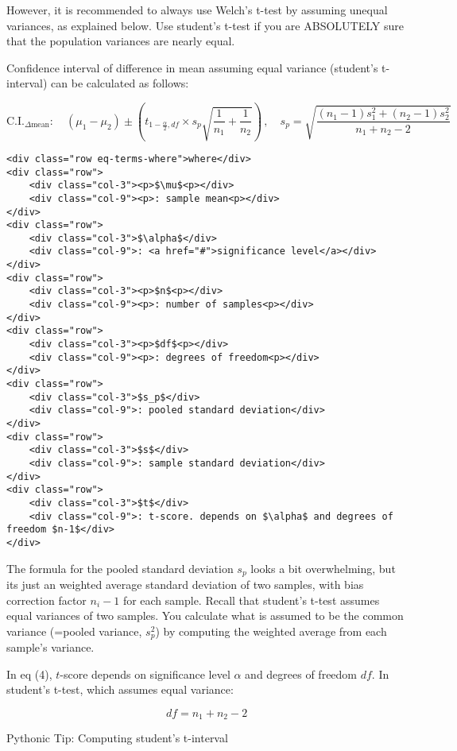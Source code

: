 \documentclass[11pt]{article}
\begin{document}
However, it is recommended to always use Welch's t-test by assuming
unequal variances, as explained below. Use student's t-test if you are
ABSOLUTELY sure that the population variances are nearly equal.

Confidence interval of difference in mean assuming equal variance
(student's t-interval) can be calculated as follows:

\hypertarget{eq-4}{}
\[ \text{C.I.}_{\Delta \text{mean}}: \quad (\mu_{1}- \mu_{2}) \pm (t_{1-\frac{\alpha}{2},df} \times s_p\sqrt{\frac{1}{n_1}+\frac{1}{n_2}})\,, \quad s_p = \sqrt{\frac{(n_1-1)s_{1}^2 + (n_2-1)s_{2}^2}{n_1+n_2-2}} \tag{4}\]

\begin{verbatim}
<div class="row eq-terms-where">where</div>
<div class="row">
    <div class="col-3"><p>$\mu$<p></div>
    <div class="col-9"><p>: sample mean<p></div>
</div>
<div class="row">
    <div class="col-3">$\alpha$</div>
    <div class="col-9">: <a href="#">significance level</a></div>
</div>    
<div class="row">
    <div class="col-3"><p>$n$<p></div>
    <div class="col-9"><p>: number of samples<p></div>
</div>
<div class="row">
    <div class="col-3"><p>$df$<p></div>
    <div class="col-9"><p>: degrees of freedom<p></div>
</div>    
<div class="row">
    <div class="col-3">$s_p$</div>
    <div class="col-9">: pooled standard deviation</div>
</div>  
<div class="row">
    <div class="col-3">$s$</div>
    <div class="col-9">: sample standard deviation</div>
</div>   
<div class="row">
    <div class="col-3">$t$</div>
    <div class="col-9">: t-score. depends on $\alpha$ and degrees of freedom $n-1$</div>
</div>   
\end{verbatim}

The formula for the pooled standard deviation \(s_p\) looks a bit
overwhelming, but its just an weighted average standard deviation of two
samples, with bias correction factor \(n_i-1\) for each sample. Recall
that student's t-test assumes equal variances of two samples. You
calculate what is assumed to be the common variance (=pooled variance,
\(s_p^2\)) by computing the weighted average from each sample's
variance.

In eq (4), \(t\)-score depends on significance level \(\alpha\) and
degrees of freedom \(df\). In student's t-test, which assumes equal
variance:

\hypertarget{eq-5}{}
\[ df = n_1 + n_2 -2 \tag{5}\]

    \hypertarget{python_ind_equal}{}

Pythonic Tip: Computing student's t-interval
\end{document}

